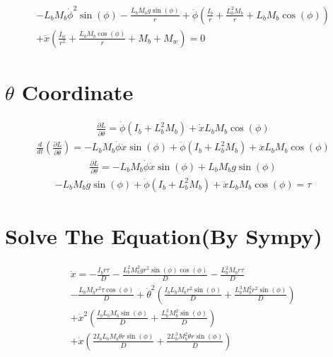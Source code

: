 \documentclass[12pt]{article}
\begin{document}
\begin{multline*}
- L_{b} M_{b} \dot{\phi}^{2} \sin{\left(\phi \right)} - \frac{L_{b} M_{b} g \sin{\left(\phi \right)}}{r} + \ddot{\phi} \left(\frac{I_{b}}{r} + \frac{L_{b}^{2} M_{b}}{r} + L_{b} M_{b} \cos{\left(\phi \right)}\right)\\
+ \ddot{x} \left(\frac{I_{w}}{r^{2}} + \frac{L_{b} M_{b} \cos{\left(\phi \right)}}{r} + M_{b} + M_{w}\right)=0
\end{multline*}

\section*{$\theta$ Coordinate}
\begin{multline*}
\frac{\partial L}{\partial \dot{\theta}}= \dot{\phi} \left(I_{b} + L_{b}^{2} M_{b}\right) + \dot{x} L_{b} M_{b} \cos{\left(\phi \right)}
\end{multline*}
\begin{multline*}
\frac{d}{dt}(\frac{\partial L}{\partial \dot{\theta}})= - L_{b} M_{b} \dot{\phi} \dot{x} \sin{\left(\phi \right)} + \ddot{\phi} \left(I_{b} + L_{b}^{2} M_{b}\right) + \ddot{x} L_{b} M_{b} \cos{\left(\phi \right)}
\end{multline*}
\begin{multline*}
\frac{\partial L}{\partial \theta}= - L_{b} M_{b} \dot{\phi} \dot{x} \sin{\left(\phi \right)} + L_{b} M_{b} g \sin{\left(\phi \right)}
\end{multline*}
\begin{multline*}
- L_{b} M_{b} g \sin{\left(\phi \right)} + \ddot{\phi} \left(I_{b} + L_{b}^{2} M_{b}\right) + \ddot{x}L_{b} M_{b} \cos{\left(\phi \right)}=\tau
\end{multline*}


\section*{Solve The Equation(By Sympy)}
\begin{multline*}
\ddot{x} = 
- \frac{I_{b} r \tau}{D} 
- \frac{L_{b}^{2} M_{b}^{2} g r^{2} \sin{\left(\phi \right)} \cos{\left(\phi \right)}}{D} 
- \frac{L_{b}^{2} M_{b} r \tau}{D} 
\\
- \frac{L_{b} M_{b} r^{2} \tau \cos{\left(\phi \right)}}{D} 
+ \dot{\theta}^{2} \left(
    \frac{I_{b} L_{b} M_{b} r^{2} \sin{\left(\phi \right)}}{D} 
    + \frac{L_{b}^{3} M_{b}^{2} r^{2} \sin{\left(\phi \right)}}{D}
\right) 
\\
+ \dot{x}^{2} \left(
    \frac{I_{b} L_{b} M_{b} \sin{\left(\phi \right)}}{D} 
    + \frac{L_{b}^{3} M_{b}^{2} \sin{\left(\phi \right)}}{D}
\right) 
\\
+ \dot{x} \left(
    \frac{2 I_{b} L_{b} M_{b} \dot{\theta} r \sin{\left(\phi \right)}}{D} 
    + \frac{2 L_{b}^{3} M_{b}^{2} \dot{\theta} r \sin{\left(\phi \right)}}{D}
\right)
\end{multline*}
\end{document}
